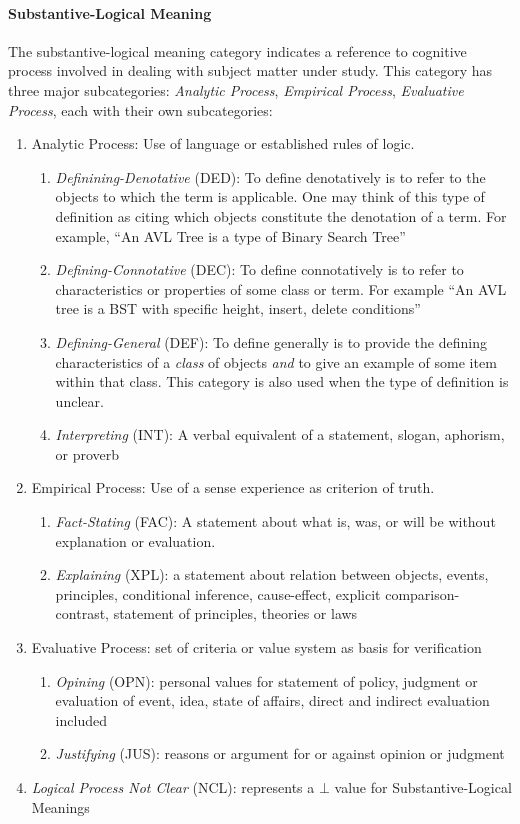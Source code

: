 \documentclass[conference]{IEEEtran}
\begin{document}
\paragraph{Substantive-Logical Meaning}
The substantive-logical meaning
category indicates a reference to cognitive process involved
in dealing with subject matter under study. This category has three major
subcategories: \emph{Analytic Process}, \emph{Empirical Process},
\emph{Evaluative Process}, each with their own subcategories:
\begin{enumerate}
  \item{Analytic Process}: Use of language or established rules of logic.
  \begin{enumerate}
    \item \emph{Definining-Denotative} (DED): To define denotatively is to
      refer to the objects to which the term is applicable. One may think of
      this type of definition as citing which objects constitute the
      denotation of a term. For example, ``An AVL Tree is a type of Binary
      Search Tree''
    \item \emph{Defining-Connotative} (DEC): To define connotatively is to
      refer to characteristics or properties of some class or term. For example ``An
      AVL tree is a BST with specific height, insert, delete conditions''
    \item \emph{Defining-General} (DEF): To define generally is to provide the
      defining characteristics of a \emph{class} of objects \emph{and} to give
      an example of some item within that class. This category is also used
      when the type of definition is unclear.
    \item \emph{Interpreting} (INT): A verbal equivalent of a statement, slogan, aphorism, or proverb
  \end{enumerate}
  \item{Empirical Process}: Use of a sense experience as criterion of truth.
  \begin{enumerate}
    \item \emph{Fact-Stating} (FAC): A statement about what is, was, or will be without explanation or evaluation.
    \item \emph{Explaining} (XPL): a statement about relation between objects, events, principles, conditional inference, cause-effect, explicit comparison-contrast, statement of principles, theories or laws
    \end{enumerate}
  \item{Evaluative Process}: set of criteria or value system as basis for verification
    \begin{enumerate}
      \item \emph{Opining} (OPN): personal values for statement of policy, judgment or evaluation of event, idea, state of affairs, direct and indirect evaluation included
      \item \emph{Justifying} (JUS): reasons or argument for or against opinion or judgment
    \end{enumerate}
  \item \emph{Logical Process Not Clear} (NCL): represents a $\bot$ value for Substantive-Logical Meanings
  \end{enumerate}
\end{document}
